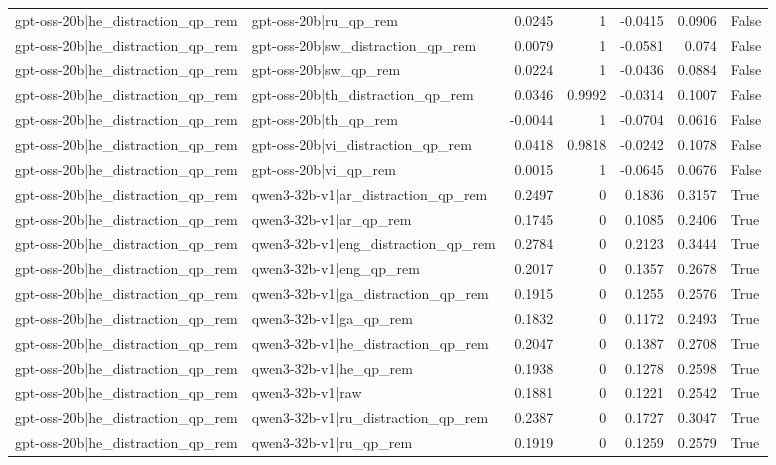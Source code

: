 \begin{table}
\begin{tabular}{l l r r r r l}
gpt-oss-20b|he_distraction_qp_rem & gpt-oss-20b|ru_qp_rem & 0.0245 & 1 & -0.0415 & 0.0906 & False \\
gpt-oss-20b|he_distraction_qp_rem & gpt-oss-20b|sw_distraction_qp_rem & 0.0079 & 1 & -0.0581 & 0.074 & False \\
gpt-oss-20b|he_distraction_qp_rem & gpt-oss-20b|sw_qp_rem & 0.0224 & 1 & -0.0436 & 0.0884 & False \\
gpt-oss-20b|he_distraction_qp_rem & gpt-oss-20b|th_distraction_qp_rem & 0.0346 & 0.9992 & -0.0314 & 0.1007 & False \\
gpt-oss-20b|he_distraction_qp_rem & gpt-oss-20b|th_qp_rem & -0.0044 & 1 & -0.0704 & 0.0616 & False \\
gpt-oss-20b|he_distraction_qp_rem & gpt-oss-20b|vi_distraction_qp_rem & 0.0418 & 0.9818 & -0.0242 & 0.1078 & False \\
gpt-oss-20b|he_distraction_qp_rem & gpt-oss-20b|vi_qp_rem & 0.0015 & 1 & -0.0645 & 0.0676 & False \\
gpt-oss-20b|he_distraction_qp_rem & qwen3-32b-v1|ar_distraction_qp_rem & 0.2497 & 0 & 0.1836 & 0.3157 & True \\
gpt-oss-20b|he_distraction_qp_rem & qwen3-32b-v1|ar_qp_rem & 0.1745 & 0 & 0.1085 & 0.2406 & True \\
gpt-oss-20b|he_distraction_qp_rem & qwen3-32b-v1|eng_distraction_qp_rem & 0.2784 & 0 & 0.2123 & 0.3444 & True \\
gpt-oss-20b|he_distraction_qp_rem & qwen3-32b-v1|eng_qp_rem & 0.2017 & 0 & 0.1357 & 0.2678 & True \\
gpt-oss-20b|he_distraction_qp_rem & qwen3-32b-v1|ga_distraction_qp_rem & 0.1915 & 0 & 0.1255 & 0.2576 & True \\
gpt-oss-20b|he_distraction_qp_rem & qwen3-32b-v1|ga_qp_rem & 0.1832 & 0 & 0.1172 & 0.2493 & True \\
gpt-oss-20b|he_distraction_qp_rem & qwen3-32b-v1|he_distraction_qp_rem & 0.2047 & 0 & 0.1387 & 0.2708 & True \\
gpt-oss-20b|he_distraction_qp_rem & qwen3-32b-v1|he_qp_rem & 0.1938 & 0 & 0.1278 & 0.2598 & True \\
gpt-oss-20b|he_distraction_qp_rem & qwen3-32b-v1|raw & 0.1881 & 0 & 0.1221 & 0.2542 & True \\
gpt-oss-20b|he_distraction_qp_rem & qwen3-32b-v1|ru_distraction_qp_rem & 0.2387 & 0 & 0.1727 & 0.3047 & True \\
gpt-oss-20b|he_distraction_qp_rem & qwen3-32b-v1|ru_qp_rem & 0.1919 & 0 & 0.1259 & 0.2579 & True \\

\end{tabular}
\end{table}
